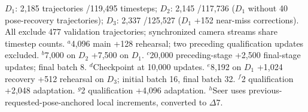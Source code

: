 \begin{table}[!ht]
\vspace{2pt}
\begin{minipage}{\linewidth}\scriptsize
$D_1$: 2,185 trajectories /119,495 timesteps;
$D_2$: 2,145 /117,736 ($D_1$ without 40 pose-recovery trajectories);
$D_3$: 2,337 /125,527 ($D_1$ +152 near-miss corrections).
All exclude 477 validation trajectories; synchronized camera streams share timestep counts.
$^a$4,096 main +128 rehearsal; two preceding qualification updates excluded.
$^b$7,000 on $D_2$ +7,500 on $D_1$.
$^c$20,000 preceding-stage +2,500 final-stage updates; final batch 8.
$^d$Checkpoint at 10,000 updates.
$^e$8,192 on $D_1$ +1,024 recovery +512 rehearsal on $D_3$; initial batch 16, final batch 32.
$^f$2 qualification +2,048 adaptation.
$^g$2 qualification +4,096 adaptation.
$^h$Seer uses previous-requested-pose-anchored local increments, converted to $\Delta7$.
\end{minipage}
\end{table}
